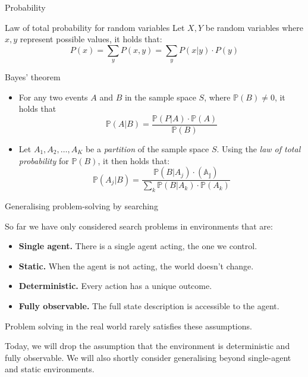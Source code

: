 \begin{frame}[allowframebreaks]{Probability}
    \begin{block}{Law of total probability for random variables}
    Let \(X,Y\) be random variables where \(x,y\) represent possible values, it holds that:
    \[
        P(x) = \sum_y P(x,y) = \sum_y P(x|y)\cdot P(y)
    \]
    \end{block}
    \framebreak
    
    
    \begin{block}{Bayes' theorem}
    \begin{itemize}
        \item For any two events \(A\) and \(B\) in the sample space \(S\), where \(\mathds{P}(B) \neq 0\), it holds that
        \[\mathds{P}(A|B) = \frac{\mathds{P}(P|A) \cdot \mathds{P}(A)}{\mathds{P}(B)}\]
        \item Let \(A_1, A_2, \dots , A_K\) be a \textit{partition} of the sample space \(S\). Using the \textit{law of total probability} for \(\mathds{P}(B)\), it then holds that:
        \[
            \mathds{P}(A_j | B) = \frac{\mathds{P}(B|A_j) \cdot \mathds{(A_j)}}{\sum_k \mathds{P}(B|A_k) \cdot \mathds{P}(A_k)}
        \]
    \end{itemize}
    \end{block}
\end{frame}

\begin{frame}{Generalising problem-solving by searching}

So far we have only considered search problems in environments that are:
\begin{itemize}
    \item \textbf{Single agent.} There is a single agent acting, the one we control.
    \item \textbf{Static.} When the agent is not acting, the world doesn't change.
    \item \textbf{Deterministic.} Every action has a unique outcome.
    \item \textbf{Fully observable.} The full state description is accessible to the agent.
\end{itemize}
Problem solving in the real world rarely satisfies these assumptions.

Today, we will drop the assumption that the environment is deterministic and fully observable. We will also shortly consider generalising beyond single-agent and static environments.

\end{frame}